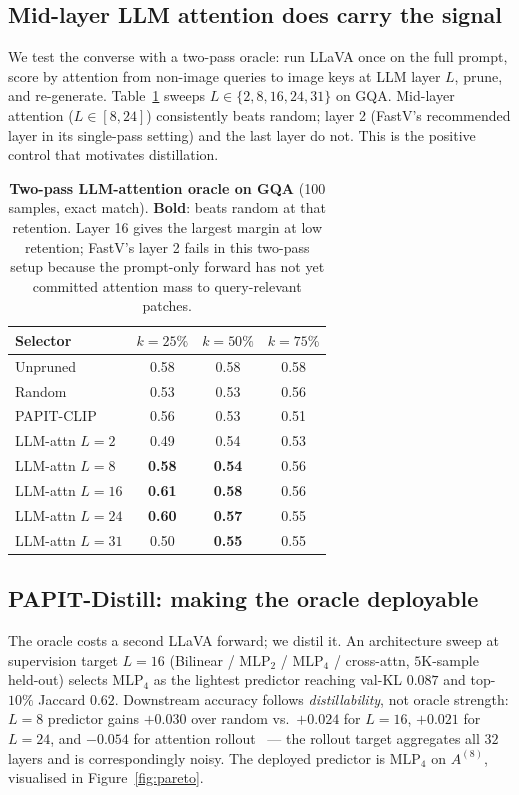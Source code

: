 \documentclass[10pt,twocolumn,letterpaper]{article}
\begin{document}
\subsection{Mid-layer LLM attention does carry the signal}
\label{sec:results-oracle}

We test the converse with a two-pass oracle: run LLaVA once on the
full prompt, score by attention from non-image queries to image keys at
LLM layer $L$, prune, and re-generate. Table~\ref{tab:oracle} sweeps
$L\!\in\!\{2,8,16,24,31\}$ on GQA. Mid-layer attention
($L\!\in\![8,24]$) consistently beats random; layer 2 (FastV's
recommended layer in its single-pass setting) and the last layer do not.
This is the positive control that motivates distillation.

\begin{table}[t]
\centering
\small
\caption{\textbf{Two-pass LLM-attention oracle on GQA} (100 samples,
exact match). \textbf{Bold}: beats random at that retention. Layer 16
gives the largest margin at low retention; FastV's layer 2 fails in this
two-pass setup because the prompt-only forward has not yet committed
attention mass to query-relevant patches.}
\label{tab:oracle}
\begin{tabular}{@{}lccc@{}}
\toprule
Selector & $k{=}25\%$ & $k{=}50\%$ & $k{=}75\%$ \\
\midrule
Unpruned             & 0.58 & 0.58 & 0.58 \\
Random               & 0.53 & 0.53 & 0.56 \\
PAPIT-CLIP           & 0.56 & 0.53 & 0.51 \\
\midrule
LLM-attn $L\!=\!2$  & 0.49 & 0.54 & 0.53 \\
LLM-attn $L\!=\!8$  & \textbf{0.58} & \textbf{0.54} & 0.56 \\
LLM-attn $L\!=\!16$ & \textbf{0.61} & \textbf{0.58} & 0.56 \\
LLM-attn $L\!=\!24$ & \textbf{0.60} & \textbf{0.57} & 0.55 \\
LLM-attn $L\!=\!31$ & 0.50 & \textbf{0.55} & 0.55 \\
\bottomrule
\end{tabular}
\end{table}

\subsection{PAPIT-Distill: making the oracle deployable}
\label{sec:distill}

The oracle costs a second LLaVA forward; we distil it. An
architecture sweep at supervision target $L\!=\!16$ (Bilinear /
$\mathrm{MLP}_2$ / $\mathrm{MLP}_4$ / cross-attn, $5$K-sample held-out)
selects $\mathrm{MLP}_4$ as the lightest predictor reaching
val-KL $0.087$ and top-$10\%$ Jaccard $0.62$. Downstream accuracy
follows \emph{distillability}, not oracle strength:
$L\!=\!8$ predictor gains $+0.030$ over random vs.\ $+0.024$ for
$L\!=\!16$, $+0.021$ for $L\!=\!24$, and $-0.054$ for attention
rollout~\cite{abnar2020rollout} — the rollout target aggregates all
$32$ layers and is correspondingly noisy. The deployed predictor is
$\mathrm{MLP}_4$ on $A^{(8)}$, visualised in
Figure~\ref{fig:pareto}.
\end{document}
